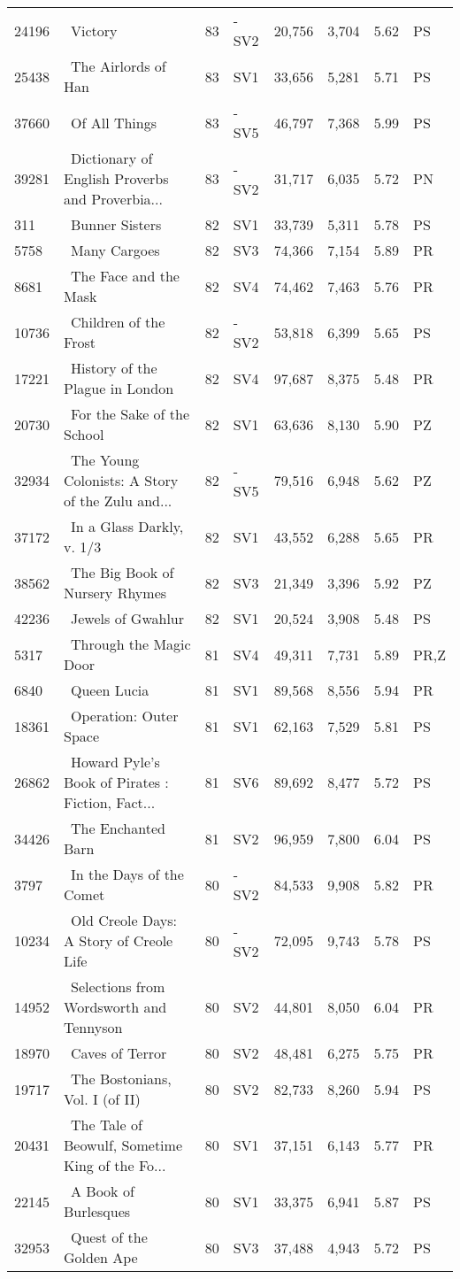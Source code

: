 \begin{longtable}{l | l | l | l | l | l | l | l}
24196 & ~Victory & 83 & -SV2 & 20,756 & 3,704 & 5.62 & PS\\
25438 & ~The Airlords of Han & 83 & SV1 & 33,656 & 5,281 & 5.71 & PS\\
37660 & ~Of All Things & 83 & -SV5 & 46,797 & 7,368 & 5.99 & PS\\
39281 & ~Dictionary of English Proverbs and Proverbia... & 83 & -SV2 & 31,717 & 6,035 & 5.72 & PN\\
311 & ~Bunner Sisters & 82 & SV1 & 33,739 & 5,311 & 5.78 & PS\\
5758 & ~Many Cargoes & 82 & SV3 & 74,366 & 7,154 & 5.89 & PR\\
8681 & ~The Face and the Mask & 82 & SV4 & 74,462 & 7,463 & 5.76 & PR\\
10736 & ~Children of the Frost & 82 & -SV2 & 53,818 & 6,399 & 5.65 & PS\\
17221 & ~History of the Plague in London & 82 & SV4 & 97,687 & 8,375 & 5.48 & PR\\
20730 & ~For the Sake of the School & 82 & SV1 & 63,636 & 8,130 & 5.90 & PZ\\
32934 & ~The Young Colonists: A Story of the Zulu and... & 82 & -SV5 & 79,516 & 6,948 & 5.62 & PZ\\
37172 & ~In a Glass Darkly, v. 1/3 & 82 & SV1 & 43,552 & 6,288 & 5.65 & PR\\
38562 & ~The Big Book of Nursery Rhymes & 82 & SV3 & 21,349 & 3,396 & 5.92 & PZ\\
42236 & ~Jewels of Gwahlur & 82 & SV1 & 20,524 & 3,908 & 5.48 & PS\\
5317 & ~Through the Magic Door & 81 & SV4 & 49,311 & 7,731 & 5.89 & PR,Z\\
6840 & ~Queen Lucia & 81 & SV1 & 89,568 & 8,556 & 5.94 & PR\\
18361 & ~Operation: Outer Space & 81 & SV1 & 62,163 & 7,529 & 5.81 & PS\\
26862 & ~Howard Pyle's Book of Pirates
: Fiction, Fact... & 81 & SV6 & 89,692 & 8,477 & 5.72 & PS\\
34426 & ~The Enchanted Barn & 81 & SV2 & 96,959 & 7,800 & 6.04 & PS\\
3797 & ~In the Days of the Comet & 80 & -SV2 & 84,533 & 9,908 & 5.82 & PR\\
10234 & ~Old Creole Days: A Story of Creole Life & 80 & -SV2 & 72,095 & 9,743 & 5.78 & PS\\
14952 & ~Selections from Wordsworth and Tennyson & 80 & SV2 & 44,801 & 8,050 & 6.04 & PR\\
18970 & ~Caves of Terror & 80 & SV2 & 48,481 & 6,275 & 5.75 & PR\\
19717 & ~The Bostonians, Vol. I (of II) & 80 & SV2 & 82,733 & 8,260 & 5.94 & PS\\
20431 & ~The Tale of Beowulf, Sometime King of the Fo... & 80 & SV1 & 37,151 & 6,143 & 5.77 & PR\\
22145 & ~A Book of Burlesques & 80 & SV1 & 33,375 & 6,941 & 5.87 & PS\\
32953 & ~Quest of the Golden Ape & 80 & SV3 & 37,488 & 4,943 & 5.72 & PS\\
\end{longtable}
